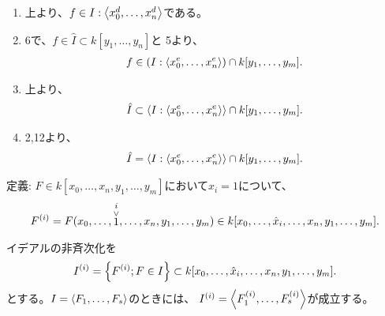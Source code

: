\begin{myproof}
\begin{enumerate}
    \item
    上より、$f\in I:\left\langle x_0^d,\dots,x_n^d \right\rangle$である。
    \item
    6で、$f\in \hat I \subset k[y_1,\dots,y_n]$と
    5より、
    \begin{align}
      f\in (I:\left\langle x_0^e,\dots,x_n^e \right\rangle) \cap k[y_1,\dots,y_m].
    \end{align}
    \item
    上より、
    \begin{align}
      \hat I \subset \left\langle I:\left\langle x_0^e,\dots,x_n^e \right\rangle \right\rangle\cap k[y_1,\dots,y_m].
    \end{align}
    \item 2,12より、
    \begin{align}
      \hat I = \left\langle I:\left\langle x_0^e,\dots,x_n^e \right\rangle \right\rangle \cap k[y_1,\dots,y_m].
    \end{align}
  \end{enumerate}
\end{myproof}


\begin{framed}
  定義:
  $F\in k[x_0,\dots,x_n,y_1,\dots,y_m]$において$x_i = 1$について、
  \begin{align}
    F^{(i)} =
    F(x_0,\dots,\stackrel{i}{\stackrel{\vee}{1}},\dots,x_n,y_1,\dots,y_m) \in
    k[x_0,\dots,\hat x_i,\dots,x_n,y_1,\dots,y_m].
  \end{align}

  イデアルの非斉次化を
  \begin{align}
    I^{(i)} = \left\{F^{(i)}; F\in I\right\}\subset
    k[x_0,\dots,\hat x_i,\dots,x_n,y_1,\dots,y_m].
  \end{align}
  とする。$I=\left\langle F_1,\dots,F_s \right\rangle$のときには、
  $I^{(i)} = \left\langle F_1^{(i)},\dots,F_s^{(i)} \right\rangle$が成立する。
\end{framed}

